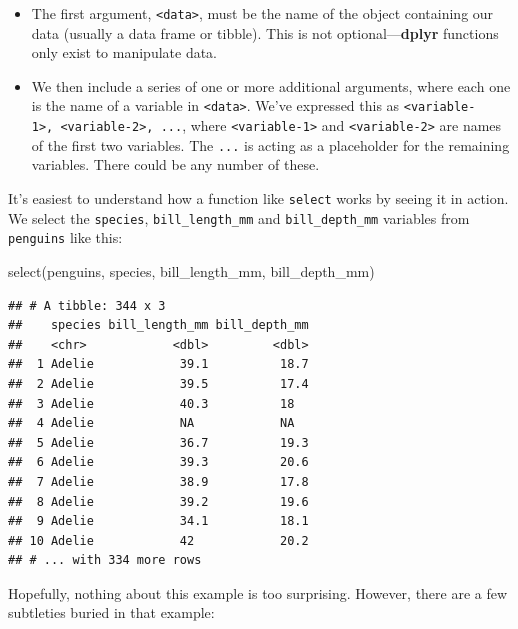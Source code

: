 \documentclass[
]{book}
\newenvironment{Shaded}{\begin{snugshade}}{\end{snugshade}}
\newcommand{\FunctionTok}[1]{\textcolor[rgb]{0.00,0.00,0.00}{#1}}
\newcommand{\NormalTok}[1]{#1}
\providecommand{\tightlist}{%
  \setlength{\itemsep}{0pt}\setlength{\parskip}{0pt}}
\begin{document}
\begin{itemize}
\tightlist
\item
  The first argument, \texttt{\textless{}data\textgreater{}}, must be the name of the object containing our data (usually a data frame or tibble). This is not optional---\textbf{dplyr} functions only exist to manipulate data.
\item
  We then include a series of one or more additional arguments, where each one is the name of a variable in \texttt{\textless{}data\textgreater{}}. We've expressed this as \texttt{\textless{}variable-1\textgreater{},\ \textless{}variable-2\textgreater{},\ ...}, where \texttt{\textless{}variable-1\textgreater{}} and \texttt{\textless{}variable-2\textgreater{}} are names of the first two variables. The \texttt{...} is acting as a placeholder for the remaining variables. There could be any number of these.
\end{itemize}

It's easiest to understand how a function like \texttt{select} works by seeing it in action. We select the \texttt{species}, \texttt{bill\_length\_mm} and \texttt{bill\_depth\_mm} variables from \texttt{penguins} like this:

\begin{Shaded}
\begin{Highlighting}[]
\FunctionTok{select}\NormalTok{(penguins, species, bill\_length\_mm, bill\_depth\_mm)}
\end{Highlighting}
\end{Shaded}

\begin{verbatim}
## # A tibble: 344 x 3
##    species bill_length_mm bill_depth_mm
##    <chr>            <dbl>         <dbl>
##  1 Adelie            39.1          18.7
##  2 Adelie            39.5          17.4
##  3 Adelie            40.3          18  
##  4 Adelie            NA            NA  
##  5 Adelie            36.7          19.3
##  6 Adelie            39.3          20.6
##  7 Adelie            38.9          17.8
##  8 Adelie            39.2          19.6
##  9 Adelie            34.1          18.1
## 10 Adelie            42            20.2
## # ... with 334 more rows
\end{verbatim}

Hopefully, nothing about this example is too surprising. However, there are a few subtleties buried in that example:
\end{document}
